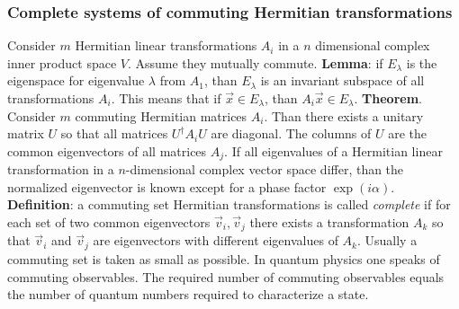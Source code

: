 \documentclass[a4paper,fancyheadings,twoside]{report}
\begin{document}
\subsubsection{Complete systems of commuting Hermitian transformations}
Consider $m$ Hermitian linear transformations $A_i$ in a $n$ dimensional
complex inner product space $V$. Assume they mutually commute.
\npar
{\bf Lemma}: if $E_\lambda$ is the eigenspace for eigenvalue $\lambda$ from
$A_1$, than $E_\lambda$ is an invariant subspace of all transformations
$A_i$. This means that if $\vec{x}\in E_\lambda$, than $A_i\vec{x}\in E_\lambda$.
\npar
{\bf Theorem}. Consider $m$ commuting Hermitian matrices $A_i$. Than there
exists a unitary matrix $U$ so that all matrices $U^\dagger A_iU$ are diagonal.
The columns of $U$ are the common eigenvectors of all matrices $A_j$.
\npar
If all eigenvalues of a Hermitian linear transformation in a $n$-dimensional
complex vector space differ, than the normalized eigenvector is known except
for a phase factor $\exp(i\alpha)$.
\npar
{\bf Definition}: a commuting set Hermitian transformations is called
{\it complete} if for each set of two common eigenvectors $\vec{v}_i,\vec{v}_j$
there exists a transformation $A_k$ so that $\vec{v}_i$ and $\vec{v}_j$ are
eigenvectors with different eigenvalues of $A_k$.
\npar
Usually a commuting set is taken as small as possible. In quantum physics one
speaks of commuting observables. The required number of commuting observables
equals the number of quantum numbers required to characterize a state.
\end{document}
